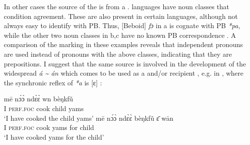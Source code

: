\documentclass[output=paper]{langsci/langscibook}
\begin{document}
\begin{table}[t]
\caption{Possessive vs. Locative Agreement in Noni}
\label{tab:hyman:ex17}
\end{table}

  In other cases the source of the  is from a .  languages have  noun classes that condition agreement. These are also present in certain  languages, although not always easy to identify with PB. Thus,  [Beboid] \textit{fɔ} in a is cognate with PB \textit{*pa}, while the other two  noun classes in b,c have no known PB correspondence \citep{Hyman1981}.
A comparison of the  marking in these examples reveals that independent pronouns are used instead of  pronouns with the above  classes, indicating that they are prepositions.
  I suggest that the same  source is involved in the development of the widespread  \textit{á {\textasciitilde} án} which comes to be used as a  and/or recipient , e.g. in , where the synchronic reflex of \textit{*a} is [ɛ] \citep[80]{Hyman1981}:
  
\ea
\label{ex:hyman:18}
\ea 
\gll mē  n\'ɔ\`ɔ     nd\`ɛ\`ɛ   w{\textlowrisea}n  bèŋkfǔ \\
I   \textsc{perf.foc} cook   child   yams\\
\glt ‘I have cooked the child yams’
\ex 
\gll mē  n\'ɔ\`ɔ     nd\`ɛ\`ɛ  bèŋkfǔ  \=ɛ   wān \\
I  \textsc{perf.foc}  cook    yams   for  child\\
\glt ‘I have cooked yams for the child’
\z 
\z 
\end{document}

